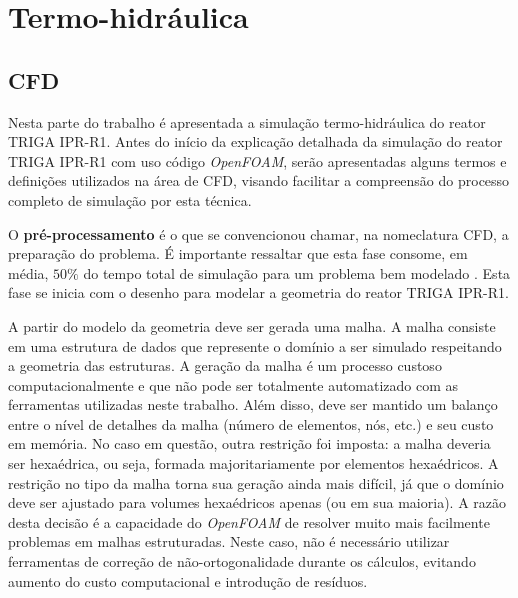 \documentclass[12pt,openright,twoside,a4paper,english,french,spanish,brazil]{abntex2}
\begin{document}
\part[Termo-hidráulica]{Termo-hidráulica}


\chapter[CFD]{CFD}
\label{chap:CFD}

Nesta parte do trabalho é apresentada a simulação termo-hidráulica do reator TRIGA IPR-R1. Antes do início 
da explicação detalhada da simulação do reator TRIGA IPR-R1 com uso código \textit{OpenFOAM}, 
serão apresentadas alguns termos e definições utilizados na área de CFD, visando facilitar a compreensão 
do processo completo de simulação por esta técnica.


O \textbf{pré-processamento} é o que se convencionou chamar, na nomeclatura CFD, a preparação do problema. É importante 
ressaltar que esta fase consome, em média, $50\%$ do tempo total de simulação para um problema bem 
modelado \cite{Versteeg2007}. Esta fase se inicia com o desenho para modelar a geometria do reator TRIGA IPR-R1. 

A partir do modelo da geometria deve ser gerada uma malha. A malha consiste em uma estrutura de dados que represente 
o domínio a ser simulado respeitando a geometria das estruturas. A geração da malha é um processo custoso 
computacionalmente e que não pode ser totalmente automatizado com as ferramentas utilizadas neste trabalho. Além disso, 
deve ser mantido um balanço entre o nível de detalhes da malha (número de elementos, nós, etc.) e seu 
custo em memória. No caso em questão, outra restrição foi imposta: a malha deveria ser hexaédrica, ou seja, 
formada majoritariamente por elementos hexaédricos.
A restrição no tipo da malha torna sua geração ainda mais difícil, já que o domínio deve ser ajustado 
para volumes hexaédricos apenas (ou em sua maioria). A razão desta decisão é a capacidade do \textit{OpenFOAM} de resolver 
muito mais facilmente problemas em malhas estruturadas. Neste caso, não é necessário utilizar ferramentas 
de correção de não-ortogonalidade durante os cálculos, evitando aumento do custo computacional e introdução de resíduos.
\end{document}
